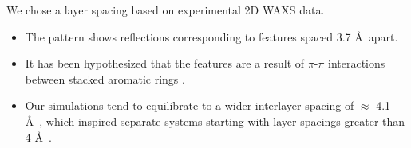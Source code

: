 \documentclass{article}
\newcommand{\angstrom}{\textup{\AA}}
\begin{document}
  We chose a layer spacing based on experimental 2D WAXS data.
  \begin{itemize}  
    \item The pattern shows reflections corresponding to features spaced 3.7 \angstrom~apart.
    \item It has been hypothesized that the features are a result of $\pi$-$\pi$
    interactions between stacked aromatic rings \cite{feng_scalable_2014}. 
    \item Our simulations tend to equilibrate to a wider interlayer spacing of
    $\approx$ 4.1 \angstrom~, which inspired separate systems starting with layer 
    spacings greater than 4 \angstrom~.
  \end{itemize}
    
  
\end{document}
